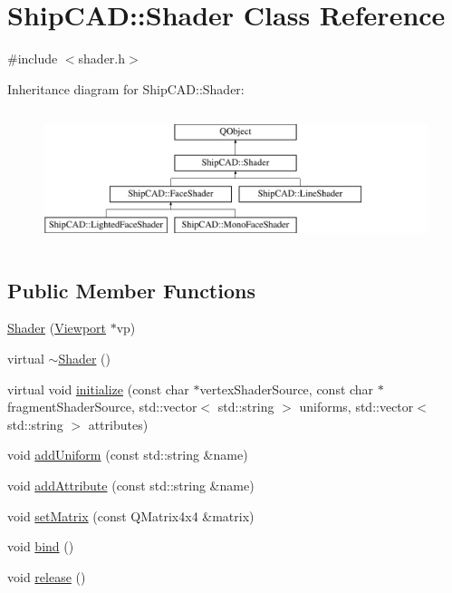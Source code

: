 \hypertarget{classShipCAD_1_1Shader}{\section{Ship\-C\-A\-D\-:\-:Shader Class Reference}
\label{classShipCAD_1_1Shader}
}


{\ttfamily \#include $<$shader.\-h$>$}

Inheritance diagram for Ship\-C\-A\-D\-:\-:Shader\-:\begin{figure}[H]
\begin{center}
\leavevmode
\includegraphics[height=3.950617cm]{classShipCAD_1_1Shader}
\end{center}
\end{figure}
\subsection*{Public Member Functions}
\begin{DoxyCompactItemize}
\item 
\hyperlink{classShipCAD_1_1Shader_a36bc24054e22fb965b04dae9a2b76eb7}{Shader} (\hyperlink{classShipCAD_1_1Viewport}{Viewport} $\ast$vp)
\item 
virtual \hyperlink{classShipCAD_1_1Shader_aff01df87e8a102f270b5b135a295e59d}{$\sim$\-Shader} ()
\item 
virtual void \hyperlink{classShipCAD_1_1Shader_a011fae279e362f548e8c4e4b35b7291e}{initialize} (const char $\ast$vertex\-Shader\-Source, const char $\ast$fragment\-Shader\-Source, std\-::vector$<$ std\-::string $>$ uniforms, std\-::vector$<$ std\-::string $>$ attributes)
\item 
void \hyperlink{classShipCAD_1_1Shader_ac8faec958f9d5806510d39be5f512c8e}{add\-Uniform} (const std\-::string \&name)
\item 
void \hyperlink{classShipCAD_1_1Shader_a6a298be357d7860d859aedbe397b81b9}{add\-Attribute} (const std\-::string \&name)
\item 
void \hyperlink{classShipCAD_1_1Shader_a7d7fe16e4eb06ad1eb19e22b38cff96e}{set\-Matrix} (const Q\-Matrix4x4 \&matrix)
\item 
void \hyperlink{classShipCAD_1_1Shader_a00c06ead1e413d5d5ecbced82478f753}{bind} ()
\item 
void \hyperlink{classShipCAD_1_1Shader_a0f41d7628964320846101cf5938a928e}{release} ()
\end{DoxyCompactItemize}
